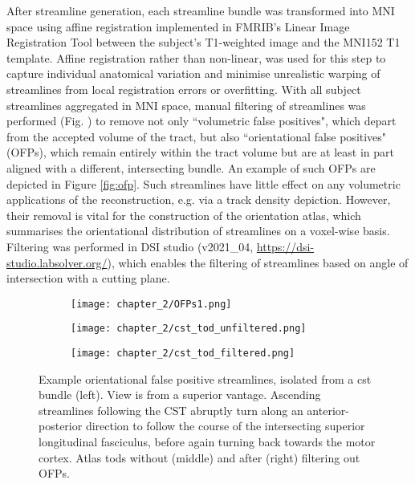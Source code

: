 After streamline generation, each streamline bundle was transformed into MNI space using affine registration implemented in FMRIB's Linear Image Registration Tool\autocite{Jenkinson2002} between the subject's T1-weighted image and the MNI152 T1 template.\autocite{Fonov2011}
Affine registration rather than non-linear, was used for this step to capture individual anatomical variation and minimise unrealistic warping of streamlines from local registration errors or overfitting.
With all subject streamlines aggregated in MNI space, manual filtering of streamlines was performed (Fig. ) to remove not only ``volumetric false positives", which depart from the accepted volume of the tract, but also ``orientational false positives" (OFPs), which remain entirely within the tract volume but are at least in part aligned with a different, intersecting bundle.
An example of such OFPs are depicted in Figure \ref{fig:ofp}. Such streamlines have little effect on any volumetric applications of the reconstruction, e.g. via a track density depiction.
However, their removal is vital for the construction of the orientation atlas, which summarises the orientational distribution of streamlines on a voxel-wise basis.
Filtering was performed in DSI studio (v2021\_04, \url{https://dsi-studio.labsolver.org/})\autocite{Yeh2021a}, which enables the filtering of streamlines based on angle of intersection with a cutting plane.

\begin{figure}[htb!]
  \centering
  \begin{subfigure}{0.3\textwidth}
    \texttt{[image: chapter\_2/OFPs1.png]}
  \end{subfigure}%
  \begin{subfigure}{0.3\textwidth}
    \texttt{[image: chapter\_2/cst\_tod\_unfiltered.png]}
  \end{subfigure}%
  \begin{subfigure}{0.3\textwidth}
    \texttt{[image: chapter\_2/cst\_tod\_filtered.png]}
  \end{subfigure}%
  \caption{Example orientational false positive streamlines, isolated from a \gls{cst} bundle (left).
  View is from a superior vantage. Ascending streamlines following the CST abruptly turn along an anterior-posterior direction to follow the course of the intersecting superior longitudinal fasciculus, before again turning back towards the motor cortex.
  Atlas \glspl{tod} without (middle) and after (right) filtering out OFPs.}
  \label{fig:ofps}
\end{figure}

